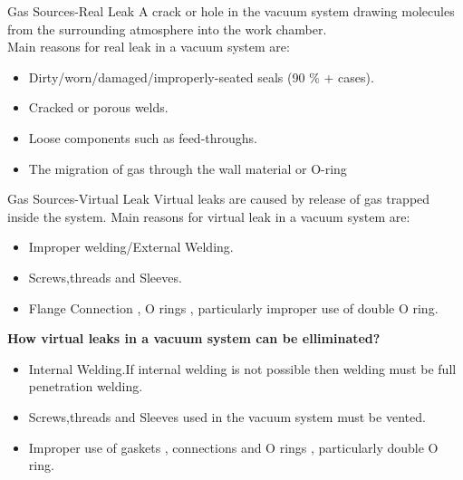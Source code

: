 \documentclass[11pt]{beamer}
\begin{document}
\begin{frame}{Gas Sources-Real Leak}
A crack or hole in the vacuum system drawing molecules from the surrounding atmosphere into the work chamber.\\
Main reasons for real leak in a vacuum system are:
\begin{itemize}
\item Dirty/worn/damaged/improperly-seated seals (90 \% + cases).
\item Cracked or porous welds.
\item Loose components such as feed-throughs.
\item The migration of gas through the wall material  or O-ring
\end{itemize}

\end{frame}

\begin{frame}{Gas Sources-Virtual Leak}
Virtual leaks are caused by release of  gas trapped inside the system.
Main reasons for virtual leak in a vacuum system are:
\begin{itemize}
\item Improper welding/External Welding.
\item Screws,threads and Sleeves.
\item Flange Connection , O rings , particularly improper use of double O ring.
\end{itemize}

\textbf{How virtual leaks in a vacuum system can be elliminated?}
\begin{itemize}
\item Internal Welding.If internal welding is not possible then welding must be full penetration welding.
\item Screws,threads and Sleeves used in the vacuum system must be vented.
\item  Improper use of  gaskets , connections and O rings , particularly double O ring.
\end{itemize}


\end{frame}
\end{document}
